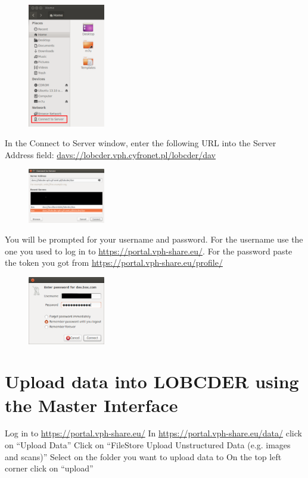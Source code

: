 \documentclass[a4paper,10pt]{report}
\begin{document}
\begin{figure}
	\centering
	\includegraphics[width=0.3\textwidth]{graphics/ver13_2.png}\label{fig:ver13_2.png}
\end{figure}


In the Connect to Server window, enter the following URL into the Server Address field: \url{davs://lobcder.vph.cyfronet.pl/lobcder/dav}


\begin{figure}
	\centering
	\includegraphics[width=0.3\textwidth]{graphics/ver13_3.png}\label{fig:ver13_3.png}
\end{figure}



You will be prompted for your username and password. For the username use the one you used to log in to \url{https://portal.vph-share.eu/}. For the password paste the token you got from \url{https://portal.vph-share.eu/profile/}

\begin{figure}
	\centering
	\includegraphics[width=0.3\textwidth]{graphics/ver13_4.png}\label{fig:ver13_4.png}
\end{figure}



\section{Upload data into LOBCDER using the Master Interface}


Log in to \url{https://portal.vph-share.eu/} 
In \url{https://portal.vph-share.eu/data/} click on ``Upload Data''
Click on ``FileStore Upload Unstructured Data (e.g. images and scans)''
Select on the folder you want to upload data to
On the top left corner click on ``upload'' 
\end{document}
